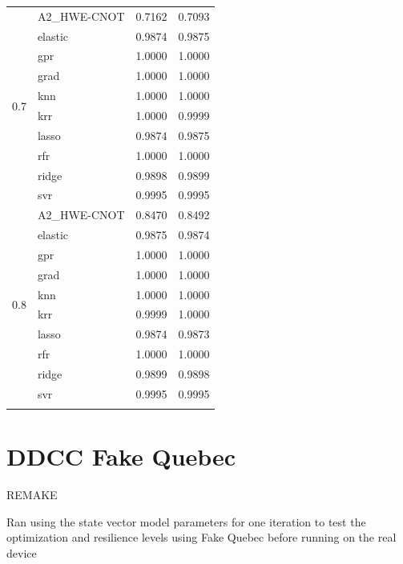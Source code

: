 \documentclass[journal=jacsat,manuscript=article]{achemso}
\begin{document}
\begin{longtable}{llrr}
	\cline{1-4}
	\multirow[t]{10}{*}{0.7} & A2{\_}HWE-CNOT & 0.7162 & 0.7093 \\
	& elastic & 0.9874 & 0.9875 \\
	& gpr & 1.0000 & 1.0000 \\
	& grad & 1.0000 & 1.0000 \\
	& knn & 1.0000 & 1.0000 \\
	& krr & 1.0000 & 0.9999 \\
	& lasso & 0.9874 & 0.9875 \\
	& rfr & 1.0000 & 1.0000 \\
	& ridge & 0.9898 & 0.9899 \\
	& svr & 0.9995 & 0.9995 \\
	\cline{1-4}
	\multirow[t]{10}{*}{0.8} & A2{\_}HWE-CNOT & 0.8470 & 0.8492 \\
	& elastic & 0.9875 & 0.9874 \\
	& gpr & 1.0000 & 1.0000 \\
	& grad & 1.0000 & 1.0000 \\
	& knn & 1.0000 & 1.0000 \\
	& krr & 0.9999 & 1.0000 \\
	& lasso & 0.9874 & 0.9873 \\
	& rfr & 1.0000 & 1.0000 \\
	& ridge & 0.9899 & 0.9898 \\
	& svr & 0.9995 & 0.9995 \\
	\cline{1-4}
	\bottomrule
	\label{table:DDCC_LC}
\end{longtable}

\section{DDCC Fake Quebec}\label{section:DDCC_fake}
REMAKE

Ran using the state vector model parameters for one iteration to test the optimization and resilience levels using Fake Quebec before running on the real device
\end{document}
